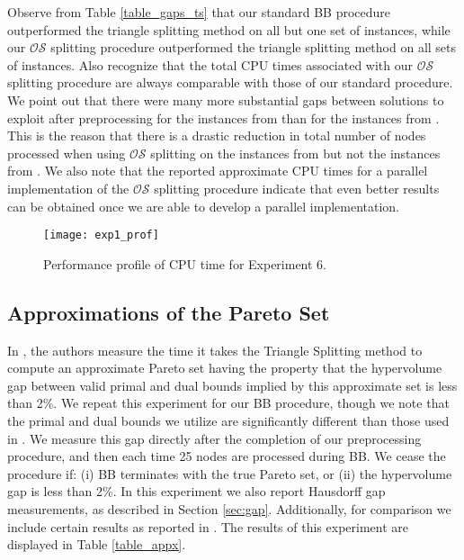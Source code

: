 \documentclass[11.5pt]{article}
\newcommand{\OS}{\mathcal{OS}}
\begin{document}
Observe from Table \ref{table_gaps_ts} that our standard BB procedure outperformed the triangle splitting method on all but one set of instances, while our $\OS$ splitting procedure outperformed the triangle splitting method on all sets of instances. Also recognize that the total CPU times associated with our $\OS$ splitting procedure are always comparable with those of our standard procedure. We point out that there were many more substantial gaps between solutions to exploit after preprocessing for the instances from \citep{belotti2012biobjective} than for the instances from \citep{boland2015acriterion}. This is the reason that there is a drastic reduction in total number of nodes processed when using $\OS$ splitting on the instances from \citep{belotti2012biobjective} but not the instances from \citep{boland2015acriterion}. We also note that the reported approximate CPU times for a parallel implementation of the $\OS$ splitting procedure indicate that even better results can be obtained once we are able to develop a parallel implementation.

\begin{figure}%
\centering
\texttt{[image: exp1\_prof]}
\caption{Performance profile of CPU time for Experiment 6.}
\label{prof}
\end{figure}

\subsection{Approximations of the Pareto Set}

In \citet{boland2015acriterion}, the authors measure the time it takes the Triangle Splitting method to compute an approximate Pareto set having the property that the hypervolume gap between valid primal and dual bounds implied by this approximate set is less than 2\%. We repeat this experiment for our BB procedure, though we note that the primal and dual bounds we utilize are significantly different than those used in \citet{boland2015acriterion}. We measure this gap directly after the completion of our preprocessing procedure, and then each time 25 nodes are processed during BB. We cease the procedure if: (i) BB terminates with the true Pareto set, or (ii) the hypervolume gap is less than 2\%. In this experiment we also report Hausdorff gap measurements, as described in Section \ref{sec:gap}. Additionally, for comparison we include certain results as reported in \citet{boland2015acriterion}. The results of this experiment are displayed in Table \ref{table_appx}.
\end{document}
